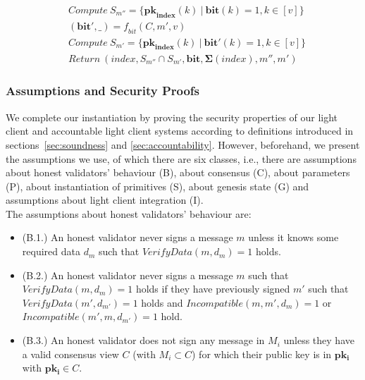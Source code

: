 \begin{itemize}
\begin{align*}
& \mathit{Compute} \ S_{m''} = \{ \mathbf{pk}_{\mathbf{index}}(k) \ | \ \mathbf{bit}(k) = 1, k \in [v] \} \\
& (\mathbf{bit'}, \_ ) = \mathit{f_{bit}}(C, m', v) \\ 
& \mathit{Compute} \ S_{m'} = \{ \mathbf{pk}_{\mathbf{index}}(k) \ | \ \mathbf{bit'}(k) = 1, k \in [v] \} \\
& \mathit{Return} \ (\mathit{index}, S_{m''} \cap S_{m'}, \mathbf{bit}, {\mathbf{\Sigma}}(\mathit{index}), {m''}, m' ) 
\end{align*}
\end{itemize}

\subsubsection{Assumptions and Security Proofs}
\label{sec:assumptions}
\label{sec:security_proofs}

\noindent We complete our instantiation by proving the security properties of our light client and accountable light client systems according to 
definitions introduced in sections~\ref{sec:soundness} and \ref{sec:accountability}. However, beforehand, we present the assumptions we use, of 
which there are six classes, i.e., there are assumptions about honest validators' behaviour (B), about consensus (C), about parameters (P), about instantiation of primitives (S), 
about genesis state (G) and assumptions about light client integration (I). \\

\noindent The assumptions about honest validators' behaviour are:
\begin{itemize}
\item (B.1.) An honest validator never signs a message $m$ unless it knows some required data $d_m$  
such that $\mathit{VerifyData}(m, d_m) = 1$ holds.
\item (B.2.) An honest validator never signs a message $m$ such that $\mathit{VerifyData}(m, d_m) = 1$ holds 
if they have previously signed $m'$ such that $\mathit{VerifyData}(m', d_{m'}) = 1$ holds and $\mathit{Incompatible}(m, m',d_m) = 1$ 
or $\mathit{Incompatible}(m', m, d_{m'}) =1$ hold.
\item (B.3.) An honest validator does not sign any message in $M_i$ unless they have a valid consensus view $C$ (with $M_i \subset C$) 
for which their public key is in $\mathbf{pk_i}$ with $\mathbf{pk_i} \in C$.
\end{itemize}

